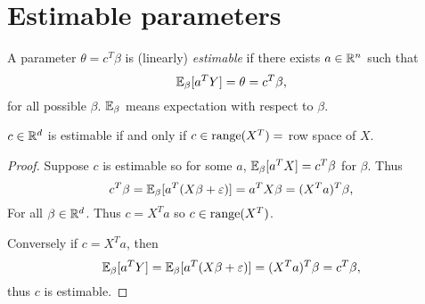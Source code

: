 \section{Estimable parameters}
\begin{defn}
    A parameter $\theta = c^T\beta$ is (linearly) \emph{estimable} if there exists $a \in {\mathbb R}^n$ such that 
    \[{\mathbb{E}}_\beta[a^TY]= \theta = c^T\beta, \]
    for all possible $\beta$. ${\mathbb{E}}_\beta$ means expectation with respect to $\beta$.
\end{defn}
\begin{prop}
    $c \in {\mathbb R}^d$ is estimable if and only if $c \in \operatorname{range}(X^T)=$ row space of $X$.
\end{prop}
\begin{proof}
    Suppose $c$ is estimable so for some $a$, ${\mathbb{E}}_\beta[a^TX] = c^T\beta$ for $\beta$. Thus
    \[c^T\beta = {\mathbb{E}}_\beta[a^T(X\beta+\varepsilon)]=a^TX\beta = (X^Ta)^T\beta,\]
    For all $\beta \in {\mathbb R}^d$. Thus $c = X^Ta$ so $c \in \operatorname{range}(X^T)$.

    Conversely if $c=X^Ta$, then 
    \[{\mathbb{E}}_\beta[a^TY]={\mathbb{E}}_\beta[a^T(X\beta+\varepsilon)]=(X^Ta)^T\beta = c^T\beta,\]
    thus $c$ is estimable.
\end{proof}

